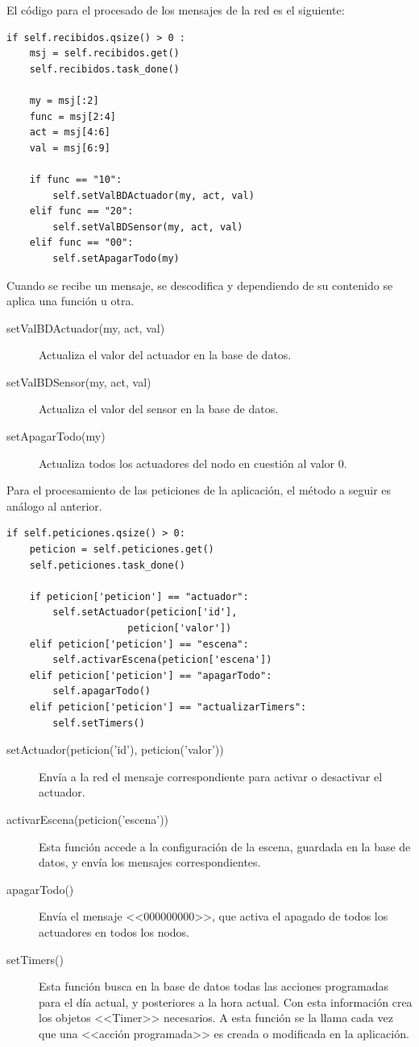 El código para el procesado de los mensajes de la red es el siguiente:
\begin{lstlisting}
if self.recibidos.qsize() > 0 :
    msj = self.recibidos.get()
    self.recibidos.task_done()

    my = msj[:2]
    func = msj[2:4]
    act = msj[4:6]
    val = msj[6:9]

    if func == "10":
        self.setValBDActuador(my, act, val)
    elif func == "20":
        self.setValBDSensor(my, act, val)
    elif func == "00":
        self.setApagarTodo(my)
\end{lstlisting}

Cuando se recibe un mensaje, se descodifica y dependiendo de su contenido se aplica una función u otra. 

\begin{description}
    \item[setValBDActuador(my, act, val)] Actualiza el valor del actuador en la base de datos.
    \item[setValBDSensor(my, act, val)] Actualiza el valor del sensor en la base de datos.
    \item[setApagarTodo(my)] Actualiza todos los actuadores del nodo en cuestión al valor 0.
\end{description}


Para el procesamiento de las peticiones de la aplicación, el método a seguir es análogo al anterior.
\begin{lstlisting}
if self.peticiones.qsize() > 0:
    peticion = self.peticiones.get()
    self.peticiones.task_done()

    if peticion['peticion'] == "actuador":
        self.setActuador(peticion['id'],
                     peticion['valor'])
    elif peticion['peticion'] == "escena":
        self.activarEscena(peticion['escena'])
    elif peticion['peticion'] == "apagarTodo":
        self.apagarTodo()
    elif peticion['peticion'] == "actualizarTimers":
        self.setTimers()
\end{lstlisting}
 
 \begin{description}
     \item[ setActuador(peticion('id'), peticion('valor')) ] Envía a la red el mensaje correspondiente para activar o desactivar el actuador.
     \item[activarEscena(peticion('escena'))] Esta función accede a la configuración de la escena, guardada en la base de datos, y envía los mensajes correspondientes.
     \item[apagarTodo()] Envía el mensaje <<000000000>>, que activa el apagado de todos los actuadores en todos los nodos.
     \item[setTimers()] Esta función busca en la base de datos todas las acciones programadas para el día actual, y posteriores a la hora actual. Con esta información crea los objetos <<Timer>> necesarios.  A esta función se la llama cada vez que una <<acción programada>> es creada o modificada en la aplicación.
    \end{description}
    
